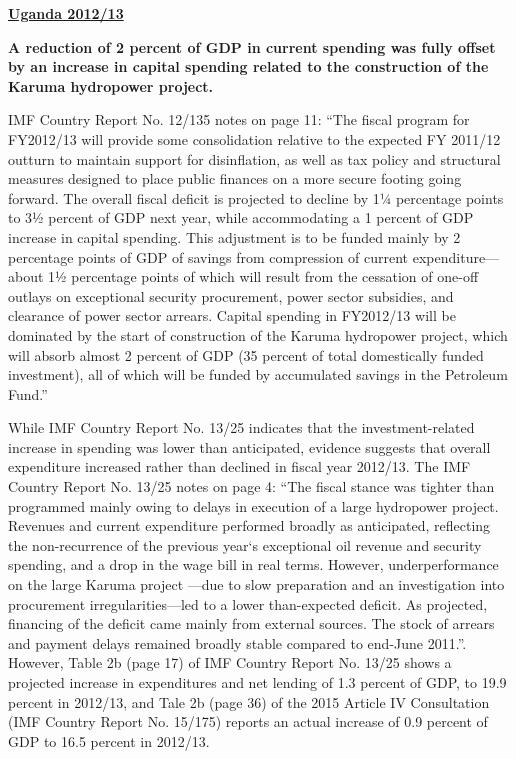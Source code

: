 \textbf{\underline{Uganda 2012/13}}

\textbf{A reduction of 2 percent of GDP in current spending was fully offset by an increase in capital spending related to the construction of the Karuma hydropower project.}

IMF Country Report No. 12/135 notes on page 11: “The fiscal program for FY2012/13 will provide some consolidation relative to the expected FY 2011/12 outturn to maintain support for disinflation, as well as tax policy and structural measures designed to place public finances on a more secure footing going forward. The overall fiscal deficit is projected to decline by 1¼ percentage points to 3½ percent of GDP next year, while accommodating a 1 percent of GDP increase in capital spending. This adjustment is to be funded mainly by 2 percentage points of GDP of savings from compression of current expenditure—about 1½ percentage points of which will result from the cessation of one-off outlays on exceptional security procurement, power sector subsidies, and clearance of power sector arrears. Capital spending in FY2012/13 will be dominated by the start of construction of the Karuma hydropower project, which will absorb almost 2 percent of GDP (35 percent of total domestically funded investment), all of which will be funded by accumulated savings in the Petroleum Fund.”

While IMF Country Report No. 13/25 indicates that the investment-related increase in spending was lower than anticipated, evidence suggests that overall expenditure increased rather than declined in fiscal year 2012/13. The IMF Country Report No. 13/25 notes on page 4: “The fiscal stance was tighter than programmed mainly owing to delays in execution of a large hydropower project. Revenues and current expenditure performed broadly as anticipated, reflecting the non-recurrence of the previous year‘s exceptional oil revenue and security spending, and a drop in the wage bill in real terms. However, underperformance on the large Karuma project —due to slow preparation and an investigation into procurement irregularities—led to a lower than-expected deficit. As projected, financing of the deficit came mainly from external sources. The stock of arrears and payment delays remained broadly stable compared to end-June 2011.”. However, Table 2b (page 17) of IMF Country Report No. 13/25 shows a projected increase in expenditures and net lending of 1.3 percent of GDP, to 19.9 percent in 2012/13, and Tale 2b (page 36) of the 2015 Article IV Consultation (IMF Country Report No. 15/175) reports an actual increase of 0.9 percent of GDP to 16.5 percent in 2012/13.

